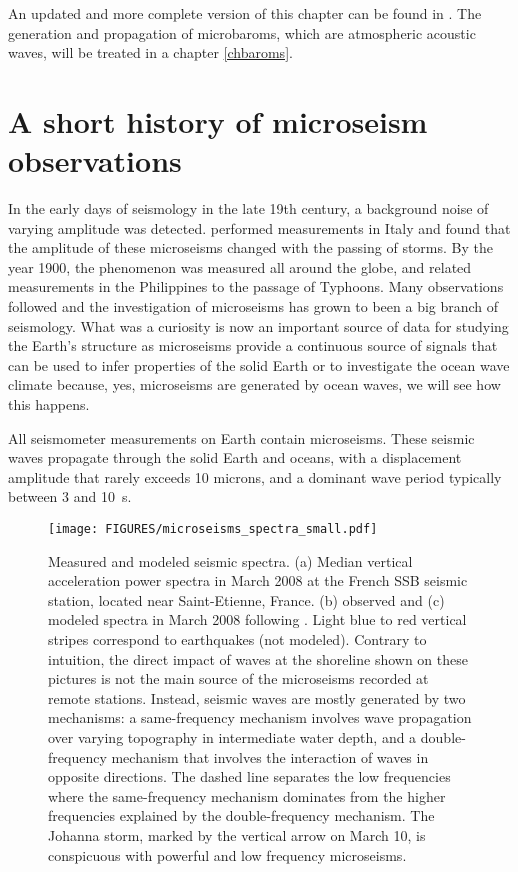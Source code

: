 An updated and more complete version of this chapter can be found in \cite{Ardhuin&al.2019}. 
The generation and propagation of microbaroms, which are atmospheric acoustic waves, will be treated in a chapter \ref{chbaroms}.

\section{A short history of microseism observations}
In the early days of seismology in the late 19th century, a background 
noise of varying amplitude was detected. \cite{Bertelli1872} performed measurements in Italy and  found that the amplitude of these microseisms changed 
with the passing of storms. By the year 1900, the phenomenon was measured all around the globe, and \cite{Algue1900} related measurements in the Philippines to the passage of Typhoons.  Many observations 
followed and the investigation of microseisms has grown to been a big branch of seismology. What was a curiosity is now an important source of data for studying the Earth's structure as microseisms provide a continuous source of signals that can be used to infer properties of the solid Earth \citep{Shapiro&al.2005} or to investigate the ocean wave climate \citep{Zopf&al.1976} because, yes, microseisms are generated by 
ocean waves, we will see how this happens. 

 All seismometer measurements on Earth contain microseisms. These seismic waves propagate through 
the solid Earth and oceans, with a displacement amplitude that rarely exceeds 10 microns, 
and a dominant wave period typically between 3 and 10~s.
\begin{figure}[htb]
\centerline{\texttt{[image: FIGURES/microseisms\_spectra\_small.pdf]}}
  \caption{Measured and modeled seismic spectra. (a) Median vertical acceleration power spectra in March 2008 at the French SSB seismic station, 
  located near Saint-Etienne, France. (b) observed and (c) modeled spectra in March 2008 following \cite{Ardhuin&al.2015}. 
  Light blue to red vertical stripes correspond to earthquakes (not modeled).   Contrary to intuition, the direct impact of waves 
  at the shoreline shown on these pictures is not the main source of the microseisms recorded at remote stations. Instead,
  seismic waves are mostly generated by two mechanisms: a same-frequency mechanism involves wave propagation over varying topography in intermediate 
  water depth, and a double-frequency mechanism that involves the interaction of waves in opposite directions. 
  The dashed line separates the low frequencies where the same-frequency mechanism dominates from the higher frequencies explained by the 
  double-frequency mechanism. The Johanna storm, marked by the vertical arrow on March 10, is conspicuous with powerful and low frequency microseisms. %
}
\label{fig:microseism_spectra}
\end{figure}

